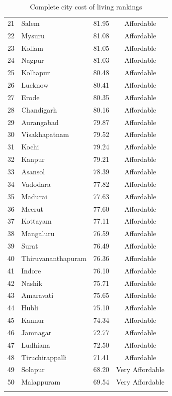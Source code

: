 \documentclass[12pt,a4paper]{article}
\begin{document}
\begin{longtable}{clcc}
  21 & Salem              &  81.95 & Affordable \\
  22 & Mysuru             &  81.08 & Affordable \\
  23 & Kollam             &  81.05 & Affordable \\
  24 & Nagpur             &  81.03 & Affordable \\
  25 & Kolhapur           &  80.48 & Affordable \\
  26 & Lucknow            &  80.41 & Affordable \\
  27 & Erode              &  80.35 & Affordable \\
  28 & Chandigarh         &  80.16 & Affordable \\
  29 & Aurangabad         &  79.87 & Affordable \\
  30 & Visakhapatnam      &  79.52 & Affordable \\
  31 & Kochi              &  79.24 & Affordable \\
  32 & Kanpur             &  79.21 & Affordable \\
  33 & Asansol            &  78.39 & Affordable \\
  34 & Vadodara           &  77.82 & Affordable \\
  35 & Madurai            &  77.63 & Affordable \\
  36 & Meerut             &  77.60 & Affordable \\
  37 & Kottayam           &  77.11 & Affordable \\
  38 & Mangaluru          &  76.59 & Affordable \\
  39 & Surat              &  76.49 & Affordable \\
  40 & Thiruvananthapuram &  76.36 & Affordable \\
  41 & Indore             &  76.10 & Affordable \\
  42 & Nashik             &  75.71 & Affordable \\
  43 & Amaravati          &  75.65 & Affordable \\
  44 & Hubli              &  75.10 & Affordable \\
  45 & Kannur             &  74.34 & Affordable \\
  46 & Jamnagar           &  72.77 & Affordable \\
  47 & Ludhiana           &  72.50 & Affordable \\
  48 & Tiruchirappalli    &  71.41 & Affordable \\
  49 & Solapur            &  68.20 & Very Affordable \\
  50 & Malappuram         &  69.54 & Very Affordable \\
  \bottomrule
  \caption{Complete city cost of living rankings}
\end{longtable}
\end{document}
